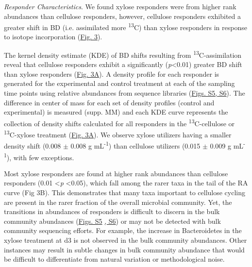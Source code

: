 \textit{Responder Characteristics}.  We found xylose responders were from higher rank abundances than cellulose responders, however, cellulose responders exhibited a greater shift in BD (i.e. assimilated more \textsuperscript{13}C) than xylose responders in response to isotope incorporation (\href{https://authorea.com/users/3537/articles/3612/master/file/figures/shift_and_rabund2/shift_and_rabund2.png}{Fig. 3}). 

The kernel density estimate (KDE) of BD shifts resulting from \textsuperscript{13}C-assimilation reveal that cellulose responders exhibit a significantly (\textit{p}\textless 0.01) greater BD shift than xylose responders (\href{https://authorea.com/users/3537/articles/3612/master/file/figures/shift_and_rabund2/shift_and_rabund2.png}{Fig. 3A}). A density profile for each responder is generated for the experimental and control treatment at each of the sampling time points using relative abundances from sequence libraries (\href{https://authorea.com/users/3537/articles/8459/master/file/figures/xylose_resp_profiles/xylose_resp_profiles.png}{Figs. S5}\href{https://authorea.com/users/3537/articles/8459/master/file/figures/cellulose_resp_profiles/cellulose_resp_profiles.png}{, S6}). The difference in center of mass for each set of density profiles (control and experimental) is measured (supp. MM) and each KDE curve represents the collection of density shifts calculated for all responders in the \textsuperscript{13}C-cellulose or \textsuperscript{13}C-xylose treatment (\href{https://authorea.com/users/3537/articles/3612/master/file/figures/shift_and_rabund2/shift_and_rabund2.png}{Fig. 3A}). We observe xylose utilizers having a smaller density shift (0.008 $\pm$ 0.008 g mL\textsuperscript{-1}) than cellulose utilizers (0.015 $\pm$ 0.009 g mL\textsuperscript{-1}), with few exceptions. 

Most xylose responders are found at higher rank abundances than cellulose responders (0.01 \textless \textit{p} \textless 0.05), which fall among the rarer taxa in the tail of the RA curve (Fig 3B). This demonstrates that many taxa important to cellulose cycling are present in the rarer fraction of the overall microbial community. Yet, the transitions in abundances of responders is difficult to discern in the bulk community abundances (\href{https://authorea.com/users/3537/articles/8459/master/file/figures/xylose_resp_profiles/xylose_resp_profiles.png}{Figs. S5} \href{https://authorea.com/users/3537/articles/8459/master/file/figures/cellulose_resp_profiles/cellulose_resp_profiles.png}{, S6}) or may not be detected with bulk community sequencing efforts. For example, the increase in Bacteroidetes in the xylose treatment at d3 is not observed in the bulk community abundances. Other instances may result in subtle changes in bulk community abundance that would be difficult to differentiate from natural variation or methodological noise.



